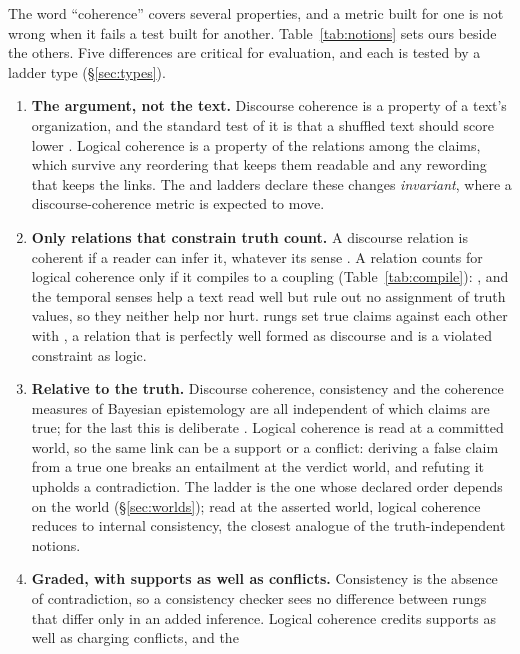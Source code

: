 \documentclass[11pt]{article}
\begin{document}
The word ``coherence'' covers several properties, and a metric built for one is not wrong when it
fails a test built for another. Table~\ref{tab:notions} sets ours beside the others. Five
differences are critical for evaluation, and each is tested by a ladder type (\S\ref{sec:types}).
\begin{enumerate}[leftmargin=1.4em,itemsep=1pt,topsep=2pt]
\item \textbf{The argument, not the text.} Discourse coherence is a property of a text's
  organization, and the standard test of it is that a shuffled text should score lower
  \citep{barzilay}. Logical coherence is a property of the relations among the claims, which
  survive any reordering that keeps them readable and any rewording that keeps the links. The
   and  ladders declare these changes \emph{invariant}, where a
  discourse-coherence metric is expected to move.
\item \textbf{Only relations that constrain truth count.} A discourse relation is coherent if a
  reader can infer it, whatever its sense \citep{hobbs1979,mann}. A relation counts for logical
  coherence only if it compiles to a coupling (Table~\ref{tab:compile}): ,
   and the temporal senses help a text read well but rule out no assignment of
  truth values, so they neither help nor hurt.  rungs set true claims against each
  other with , a relation that is perfectly well formed as discourse and is a
  violated constraint as logic.
\item \textbf{Relative to the truth.} Discourse coherence, consistency and the coherence measures
  of Bayesian epistemology are all independent of which claims are true; for the last this is
  deliberate \citep{shogenji1999,olsson2002}. Logical coherence is read at a committed world,
  so the same link can be a support or a conflict: deriving a false claim from a true one breaks
  an entailment at the verdict world, and refuting it upholds a contradiction. The 
  ladder is the one whose declared order depends on the world (\S\ref{sec:worlds}); read at the
  asserted world, logical coherence reduces to internal consistency, the closest analogue of the
  truth-independent notions.
\item \textbf{Graded, with supports as well as conflicts.} Consistency is the absence of
  contradiction, so a consistency checker sees no difference between rungs that differ only in an
  added inference. Logical coherence credits supports as well as charging conflicts, and the

\end{enumerate}
\end{document}
